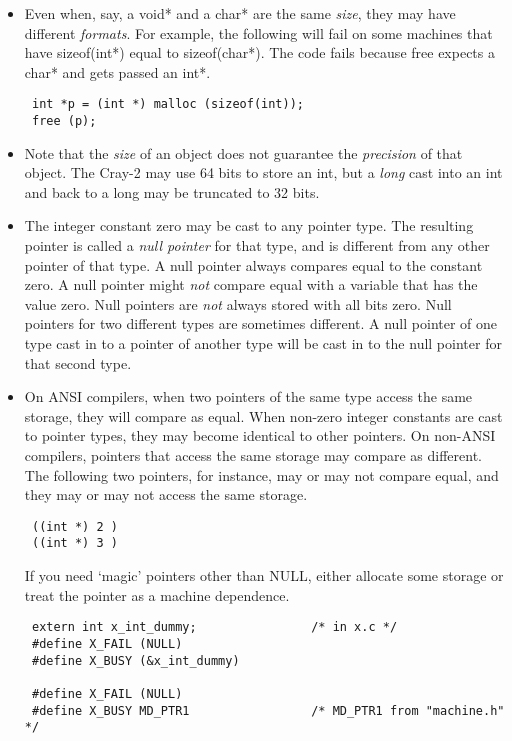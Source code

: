 \begin{itemize}
\item Even when, say, a void* and a char* are the same {\em size}, they may
have different {\em formats}.  For example, the following will fail on some
machines that have sizeof(int*) equal to  sizeof(char*). The code fails
because free expects a char* and gets passed an int*. 
\begin{verbatim}
 int *p = (int *) malloc (sizeof(int));
 free (p);
\end{verbatim}

\item Note that the {\em size} of an object does not guarantee the
{\em precision} of that object. The Cray-2 may use 64 bits to store an int,
but a {\em long} cast into an
int and back to a long may be truncated to 32 bits. 

\item The integer constant zero may be cast to any pointer type. The resulting
pointer is called a {\em null pointer} for that type, and is different from any
other pointer of that type. A null pointer always compares equal to the
constant zero. A null pointer might {\em not} compare equal with a variable
that has the value zero. Null pointers are {\em not} always stored with all
bits zero. Null pointers for two different types are sometimes different. A
null pointer of one type cast in to a pointer of another type will be cast in
to the null pointer for that second type. 

\item On ANSI compilers, when two pointers of the same type access the same
storage, they will compare as equal. When non-zero integer constants are cast
to pointer types, they may become identical to other pointers. On non-ANSI
compilers, pointers that access the same storage may compare as different. The
following two pointers, for instance, may or may not compare equal, and they
may or may not access the same storage.
\begin{verbatim}
 ((int *) 2 )
 ((int *) 3 ) 
\end{verbatim}

If you need `magic' pointers other than NULL, either allocate some storage or
treat the pointer as a machine dependence. 

\begin{verbatim}
 extern int x_int_dummy;                /* in x.c */
 #define X_FAIL (NULL)
 #define X_BUSY (&x_int_dummy)

 #define X_FAIL (NULL)
 #define X_BUSY MD_PTR1                 /* MD_PTR1 from "machine.h" */ 
\end{verbatim}


\end{itemize}

